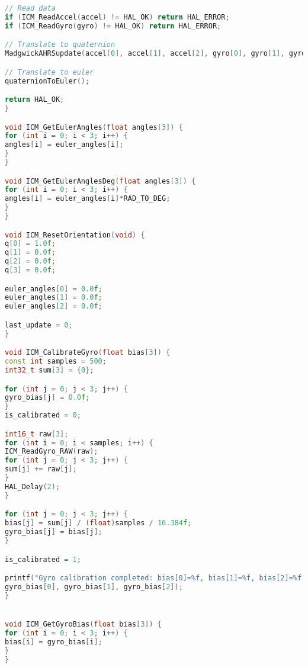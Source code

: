 \begin{lstlisting}[language=C++]
// Read data
if (ICM_ReadAccel(accel) != HAL_OK) return HAL_ERROR;
if (ICM_ReadGyro(gyro) != HAL_OK) return HAL_ERROR;

// Translate to quaternion
MadgwickAHRSupdate(accel[0], accel[1], accel[2], gyro[0], gyro[1], gyro[2]);

// Translate to euler
quaternionToEuler();

return HAL_OK;
}

void ICM_GetEulerAngles(float angles[3]) {
for (int i = 0; i < 3; i++) {
angles[i] = euler_angles[i];
}
}

void ICM_GetEulerAnglesDeg(float angles[3]) {
for (int i = 0; i < 3; i++) {
angles[i] = euler_angles[i]*RAD_TO_DEG;
}
}

void ICM_ResetOrientation(void) {
q[0] = 1.0f;
q[1] = 0.0f;
q[2] = 0.0f;
q[3] = 0.0f;

euler_angles[0] = 0.0f;
euler_angles[1] = 0.0f;
euler_angles[2] = 0.0f;

last_update = 0;
}

void ICM_CalibrateGyro(float bias[3]) {
const int samples = 500;
int32_t sum[3] = {0};

for (int j = 0; j < 3; j++) {
gyro_bias[j] = 0.0f;
}
is_calibrated = 0;

int16_t raw[3];
for (int i = 0; i < samples; i++) {
ICM_ReadGyro_RAW(raw);
for (int j = 0; j < 3; j++) {
sum[j] += raw[j];
}
HAL_Delay(2);
}

for (int j = 0; j < 3; j++) {
bias[j] = sum[j] / (float)samples / 16.384f;
gyro_bias[j] = bias[j];
}

is_calibrated = 1;

printf("Gyro calibration completed: bias[0]=%f, bias[1]=%f, bias[2]=%f deg/s\r\n",
gyro_bias[0], gyro_bias[1], gyro_bias[2]);
}


void ICM_GetGyroBias(float bias[3]) {
for (int i = 0; i < 3; i++) {
bias[i] = gyro_bias[i];
}
}

\end{lstlisting}

\endinput